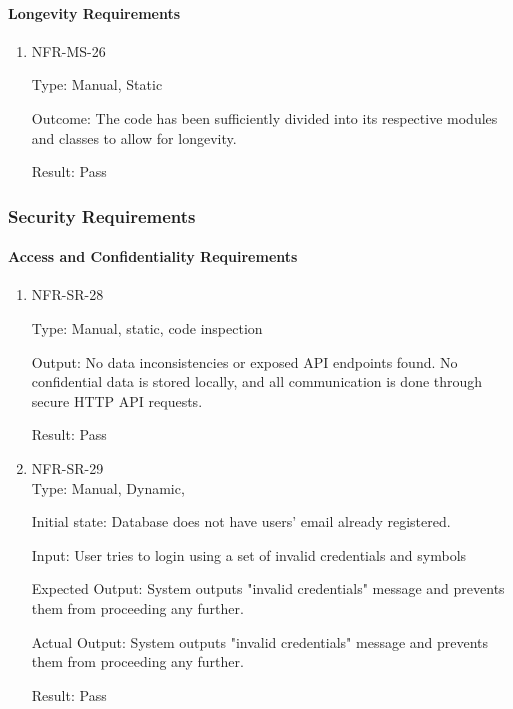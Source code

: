 \documentclass[12pt, titlepage]{article}
\begin{document}
 \paragraph{Longevity Requirements}
\begin{enumerate}
    \item{NFR-MS-26\\}
    
    Type: Manual, Static
    
    Outcome: The code has been sufficiently divided into its respective modules and classes to allow for longevity.
    					
    Result: Pass
    
    
 \end{enumerate} 
 
\subsubsection{Security Requirements}
 \paragraph{Access and Confidentiality Requirements}
\begin{enumerate}
    \item{NFR-SR-28\\}
    
    Type: Manual, static, code inspection
    
    Output: No data inconsistencies or exposed API endpoints found. No confidential data is stored locally, and all communication is done through secure HTTP API requests.
    
    Result: Pass
    
    \item{NFR-SR-29\\}
    Type: Manual, Dynamic, 
    
    Initial state: Database does not have users' email already registered.
    
    Input: User tries to login using a set of invalid credentials and symbols
    
    Expected Output: System outputs "invalid credentials" message and prevents them from proceeding any further.
    
    Actual Output: System outputs "invalid credentials" message and prevents them from proceeding any further.
    					
    Result: Pass
    
 \end{enumerate} 
 
\end{document}
